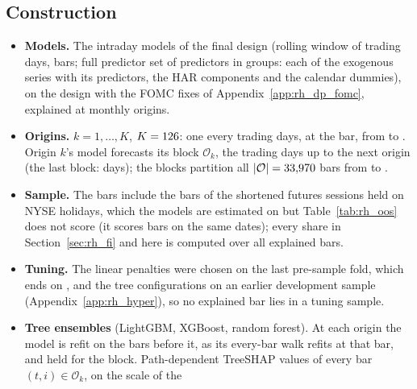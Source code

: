 \subsection{Construction}
\label{app:rh_fi_compute}
\begin{itemize}
\item \textbf{Models.} The intraday models of the final design (rolling window of \rhfipWindowDays{} trading
  days, \rhfipWindowBars{} bars; full predictor set of \rhfipNCols{} predictors in \rhfipNGroups{} groups: each of the
  \rhfipNExog{} exogenous series with its \rhfipNPerSeries{} predictors, the HAR components and the calendar dummies),
  on the design with the FOMC fixes of Appendix~\ref{app:rh_dp_fomc}, explained at monthly origins.
\item \textbf{Origins.} $k = 1, \dots, K$, $K = 126$: one every \rhfipOriginEvery{} trading days, at the
  \rhfipBarFirst{} bar, from \rhfipFirstOrigin{} to \rhfipLastOrigin. Origin $k$'s model forecasts its block
  $\mathcal O_k$, the \rhfipOriginEvery{} trading days up to the next origin (the last block: \rhfipLastBlock{} days);
  the blocks partition all $|\mathcal O| = 33{,}970$ bars from \rhfipFirstOrigin{} to \rhfipLastDay.
\item \textbf{Sample.} The \rhfipNRows{} bars include the bars of the shortened futures sessions held on NYSE
  holidays, which the models are estimated on but Table~\ref{tab:rh_oos} does not score (it scores \rhorNIntB{} bars
  on the same dates); every share in Section~\ref{sec:rh_fi} and here is computed over all explained bars.
\item \textbf{Tuning.} The linear penalties were chosen on the last pre-sample fold, which ends on \rhfipTuneLast, and
  the tree configurations on an earlier development sample (Appendix~\ref{app:rh_hyper}), so no explained bar lies in
  a tuning sample.
\item \textbf{Tree ensembles} (LightGBM, XGBoost, random forest). At each origin the model is refit on the
  \rhfipWindowBars{} bars before it, as its every-bar walk refits at that bar, and held for the block.
  Path-dependent TreeSHAP values \citep{lundberg2020local} of every bar $(t,i) \in \mathcal O_k$, on the scale of the

\end{itemize}
